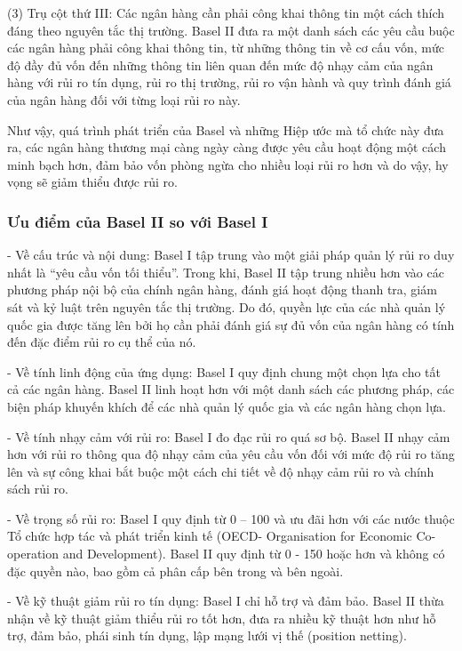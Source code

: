(3) Trụ cột thứ III: Các ngân hàng cần phải công khai thông tin một cách thích đáng theo nguyên tắc thị trường. Basel II đưa ra một danh sách các yêu cầu buộc các ngân hàng phải công khai thông tin, từ những thông tin về cơ cấu vốn, mức độ đầy đủ vốn đến những thông tin liên quan đến mức độ nhạy cảm của ngân hàng với rủi ro tín dụng, rủi ro thị trường, rủi ro vận hành và quy trình đánh giá của ngân hàng đối với từng loại rủi ro này.

Như vậy, quá trình phát triển của Basel và những Hiệp ước mà tổ chức này đưa ra, các ngân hàng thương mại càng ngày càng được yêu cầu hoạt động một cách minh bạch hơn, đảm bảo vốn phòng ngừa cho nhiều loại rủi ro hơn và do vậy, hy vọng sẽ giảm thiểu được rủi ro.

\subsubsection{Ưu điểm của Basel II so với Basel I}

- Về cấu trúc và nội dung: Basel I tập trung vào một giải pháp quản lý rủi ro duy nhất là “yêu cầu vốn tối thiểu”. Trong khi, Basel II tập trung nhiều hơn vào các phương pháp nội bộ của chính ngân hàng, đánh giá hoạt động thanh tra, giám sát và kỷ luật trên nguyên tắc thị trường. Do đó, quyền lực của các nhà quản lý quốc gia được tăng lên bởi họ cần phải đánh giá sự đủ vốn của ngân hàng có tính đến đặc điểm rủi ro cụ thể của nó.

- Về tính linh động của ứng dụng: Basel I quy định chung một chọn lựa cho tất cả các ngân hàng. Basel II linh hoạt hơn với một danh sách các phương pháp, các biện pháp khuyến khích để các nhà quản lý quốc gia và các ngân hàng chọn lựa.

- Về tính nhạy cảm với rủi ro: Basel I đo đạc rủi ro quá sơ bộ. Basel II nhạy cảm hơn với rủi ro thông qua độ nhạy cảm của yêu cầu vốn đối với mức độ rủi ro tăng lên và sự công khai bắt buộc một cách chi tiết về độ nhạy cảm rủi ro và chính sách rủi ro.

- Về trọng số rủi ro: Basel I quy định từ 0 – 100 và ưu đãi hơn với các nước thuộc Tổ chức hợp tác và phát triển kinh tế (OECD- Organisation for Economic Co-operation and Development). Basel II quy định từ 0 - 150 hoặc hơn và không có đặc quyền nào, bao gồm cả phân cấp bên trong và bên ngoài.

- Về kỹ thuật giảm rủi ro tín dụng: Basel I chỉ hỗ trợ và đảm bảo. Basel II thừa nhận về kỹ thuật giảm thiểu rủi ro tốt hơn, đưa ra nhiều kỹ thuật hơn như hỗ trợ, đảm bảo, phái sinh tín dụng, lập mạng lưới vị thế (position netting).

